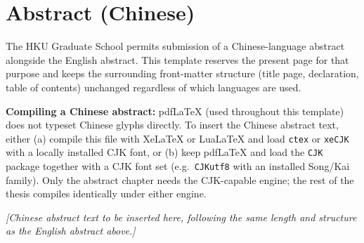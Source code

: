 \chapter*{Abstract (Chinese)}
\thispagestyle{plain}

The HKU Graduate School permits submission of a Chinese-language abstract alongside the English abstract. This template reserves the present page for that purpose and keeps the surrounding front-matter structure (title page, declaration, table of contents) unchanged regardless of which languages are used.

\begin{notebox}
\textbf{Compiling a Chinese abstract:} pdfLaTeX (used throughout this template) does not typeset Chinese glyphs directly. To insert the Chinese abstract text, either (a) compile this file with XeLaTeX or LuaLaTeX and load \texttt{ctex} or \texttt{xeCJK} with a locally installed CJK font, or (b) keep pdfLaTeX and load the \texttt{CJK} package together with a CJK font set (e.g.\ \texttt{CJKutf8} with an installed Song/Kai family). Only the abstract chapter needs the CJK-capable engine; the rest of the thesis compiles identically under either engine.
\end{notebox}

\vspace{0.2in}
\noindent\textit{[Chinese abstract text to be inserted here, following the same length and structure as the English abstract above.]}

